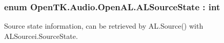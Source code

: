 \hypertarget{namespace_open_t_k_1_1_audio_1_1_open_a_l_a5b2a6fe6458bb334071d8246600865cc}{
\subsubsection[{A\-L\-Source\-State}]{\setlength{\rightskip}{0pt plus 5cm}enum {\bf Open\-T\-K.\-Audio.\-Open\-A\-L.\-A\-L\-Source\-State} \-: int}}\label{namespace_open_t_k_1_1_audio_1_1_open_a_l_a5b2a6fe6458bb334071d8246600865cc}


Source state information, can be retrieved by A\-L.\-Source() with A\-L\-Sourcei.\-Source\-State.

